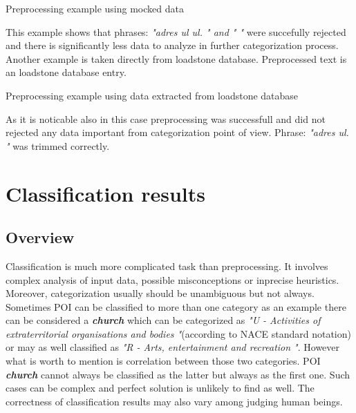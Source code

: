 \begin{algorithm}
	\hfill \break
	\caption{Preprocessing example using mocked data}\label{alg:1st}
\end{algorithm}
This example shows that phrases: \textit{"adres ul ul. " and " "} were succefully rejected and there is significantly less data to analyze in further categorization process.
\newline
Another example is taken directly from loadstone database. Preprocessed text is an loadstone database entry.
\begin{algorithm}
	\hfill \break
	\caption{Preprocessing example using data extracted from loadstone database}\label{alg:2nd}
\end{algorithm}
\newline
As it is noticable also in this case preprocessing was successfull and did not rejected any data important from categorization point of view. Phrase: \textit{"adres ul. "} was trimmed correctly.
 
  
\section{Classification results}
\label{classification_results}
\subsection{Overview}
Classification is much more complicated task than preprocessing. It involves complex analysis of input data, possible misconceptions or inprecise heuristics. Moreover, categorization usually should be unambiguous but not always. Sometimes POI can be classified to more than one category as an example there can be considered a \textit{\textbf{church}} which can be categorized as \textit{"U - Activities of extraterritorial organisations and bodies "}(according to NACE standard notation) or may as well classified as \textit{"R - Arts, entertainment and recreation "}. However what is worth to mention is correlation between those two categories. POI \textit{\textbf{church}} cannot always be classified as the latter but always as the first one. Such cases can be complex and perfect solution is unlikely to find as well. The correctness of classification results may also vary among judging human beings.    
